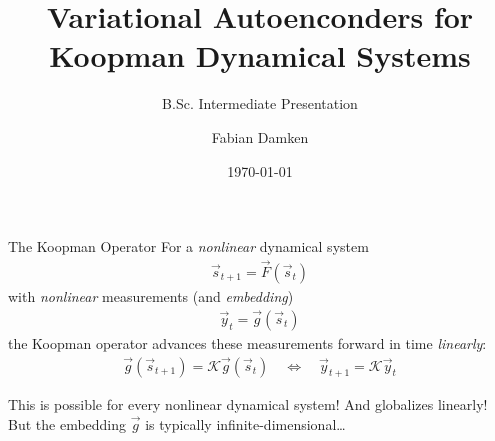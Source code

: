 \documentclass[
	aspectratio=43,
	color={accentcolor=1c},
	logo=false,
	colorframetitle=true,
]{tudabeamer}
\title{Variational Autoenconders for Koopman Dynamical Systems}
\subtitle{B.Sc. Intermediate Presentation}
\author{Fabian Damken}
\institute{Intelligent Autonomous Systems}
\date{\today}
\begin{document}
	\maketitle

	\begin{frame}{The Koopman Operator}
		For a \emph{nonlinear} dynamical system
		\begin{align*}
			\vec{s}_{t + 1} = \vec{F}(\vec{s}_{t})
		\end{align*}
		with \emph{nonlinear} measurements (and \emph{embedding})
		\begin{align*}
			\vec{y}_t = \vec{g}(\vec{s}_t)
		\end{align*}
		the Koopman operator advances these measurements forward in time \emph{linearly}:
		\begin{align*}
			\vec{g}(\vec{s}_{t + 1}) = \mathcal{K} \vec{g}(\vec{s}_t)
			\quad\iff\quad
			\vec{y}_{t + 1} = \mathcal{K} \vec{y}_t
		\end{align*}

		This is possible for every nonlinear dynamical system! And globalizes linearly! But the embedding \(\vec{g}\) is typically infinite-dimensional\dots
	\end{frame}
\end{document}
